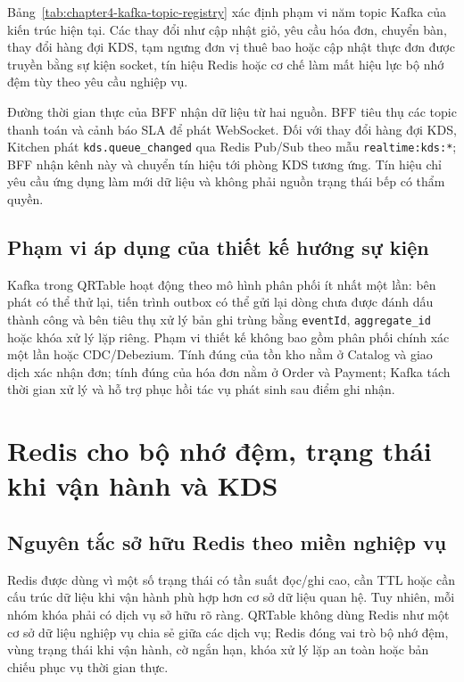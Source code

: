 Bảng~\ref{tab:chapter4-kafka-topic-registry} xác định phạm vi năm topic Kafka của kiến trúc hiện tại. Các thay đổi như cập nhật giỏ, yêu cầu hóa đơn, chuyển bàn, thay đổi hàng đợi KDS, tạm ngưng đơn vị thuê bao hoặc cập nhật thực đơn được truyền bằng sự kiện socket, tín hiệu Redis hoặc cơ chế làm mất hiệu lực bộ nhớ đệm tùy theo yêu cầu nghiệp vụ.

Đường thời gian thực của BFF nhận dữ liệu từ hai nguồn. BFF tiêu thụ các topic thanh toán và cảnh báo SLA để phát WebSocket. Đối với thay đổi hàng đợi KDS, Kitchen phát \texttt{kds.queue\_changed} qua Redis Pub/Sub theo mẫu \texttt{realtime:kds:*}; BFF nhận kênh này và chuyển tín hiệu tới phòng KDS tương ứng. Tín hiệu chỉ yêu cầu ứng dụng làm mới dữ liệu và không phải nguồn trạng thái bếp có thẩm quyền.

\subsection{Phạm vi áp dụng của thiết kế hướng sự kiện}

Kafka trong QRTable hoạt động theo mô hình phân phối ít nhất một lần: bên phát có thể thử lại, tiến trình outbox có thể gửi lại dòng chưa được đánh dấu thành công và bên tiêu thụ xử lý bản ghi trùng bằng \texttt{eventId}, \texttt{aggregate\_id} hoặc khóa xử lý lặp riêng. Phạm vi thiết kế không bao gồm phân phối chính xác một lần hoặc CDC/Debezium. Tính đúng của tồn kho nằm ở Catalog và giao dịch xác nhận đơn; tính đúng của hóa đơn nằm ở Order và Payment; Kafka tách thời gian xử lý và hỗ trợ phục hồi tác vụ phát sinh sau điểm ghi nhận.

\section{Redis cho bộ nhớ đệm, trạng thái khi vận hành và KDS}

\subsection{Nguyên tắc sở hữu Redis theo miền nghiệp vụ}

Redis được dùng vì một số trạng thái có tần suất đọc/ghi cao, cần TTL hoặc cần cấu trúc dữ liệu khi vận hành phù hợp hơn cơ sở dữ liệu quan hệ. Tuy nhiên, mỗi nhóm khóa phải có dịch vụ sở hữu rõ ràng. QRTable không dùng Redis như một cơ sở dữ liệu nghiệp vụ chia sẻ giữa các dịch vụ; Redis đóng vai trò bộ nhớ đệm, vùng trạng thái khi vận hành, cờ ngắn hạn, khóa xử lý lặp an toàn hoặc bản chiếu phục vụ thời gian thực.

